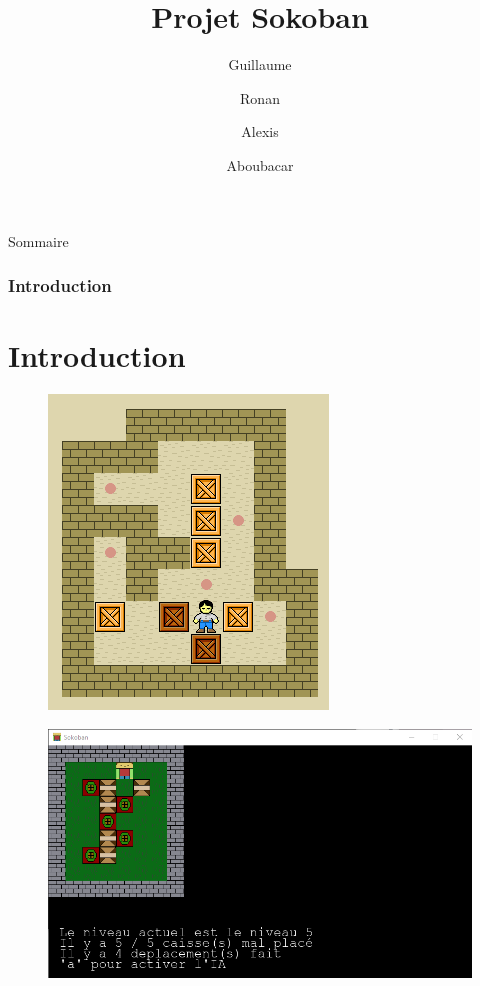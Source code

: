\documentclass{beamer}
\title{Projet Sokoban}
\author{Guillaume \and Ronan \and Alexis \and Aboubacar}
\institute{Université de Caen Normandie \\ Conception logiciel}
\begin{document}
\begin{frame}
\titlepage
\end{frame}


\begin{frame}{Sommaire}
\tableofcontents
\end{frame}
\frametitle{Introduction}
\section{Introduction} 
\begin{frame}

\begin{figure}
        \centering
        \includegraphics[scale=0.3]{../picture/WIKIPEDIA.png}
\end{figure}
\begin{figure}
        \centering
        \includegraphics[scale=0.3]{../picture/monjeu.png}
\end{figure}
\end{frame}
\end{document}
